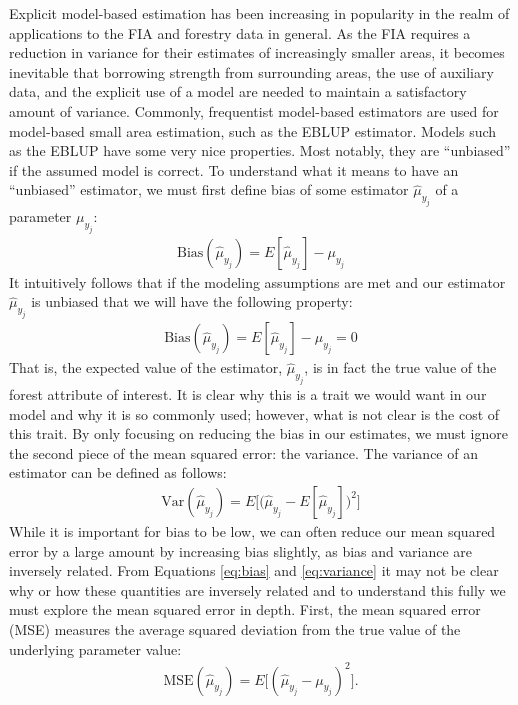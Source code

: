 \documentclass[12pt,twoside]{reedthesis}
\begin{document}
Explicit model-based estimation has been increasing in popularity in the realm of applications to the FIA and forestry data in general. As the FIA requires a reduction in variance for their estimates of increasingly smaller areas, it becomes inevitable that borrowing strength from surrounding areas, the use of auxiliary data, and the explicit use of a model are needed to maintain a satisfactory amount of variance. Commonly, frequentist model-based estimators are used for model-based small area estimation, such as the EBLUP estimator. Models such as the EBLUP have some very nice properties. Most notably, they are ``unbiased'' if the assumed model is correct. To understand what it means to have an ``unbiased'' estimator, we must first define bias of some estimator \(\hat\mu_{y_j}\) of a parameter \(\mu_{y_j}\):
\begin{align}
\text{Bias}(\hat\mu_{y_j}) = E[\hat\mu_{y_j}] - \mu_{y_j} \label{eq:bias}
\end{align}
It intuitively follows that if the modeling assumptions are met and our estimator \(\hat\mu_{y_j}\) is unbiased that we will have the following property:
\begin{align}
\text{Bias}(\hat\mu_{y_j}) = E[\hat\mu_{y_j}] - \mu_{y_j} = 0
\end{align}
That is, the expected value of the estimator, \(\hat\mu_{y_j}\), is in fact the true value of the forest attribute of interest. It is clear why this is a trait we would want in our model and why it is so commonly used; however, what is not clear is the cost of this trait. By only focusing on reducing the bias in our estimates, we must ignore the second piece of the mean squared error: the variance. The variance of an estimator can be defined as follows:
\begin{align}
\text{Var}(\hat\mu_{y_j}) = E\Big[\Big(\hat\mu_{y_j} - E[\hat\mu_{y_j}]\Big)^2 \Big] \label{eq:variance}
\end{align}
While it is important for bias to be low, we can often reduce our mean squared error by a large amount by increasing bias slightly, as bias and variance are inversely related. From Equations \eqref{eq:bias} and \eqref{eq:variance} it may not be clear why or how these quantities are inversely related and to understand this fully we must explore the mean squared error in depth. First, the mean squared error (MSE) measures the average squared deviation from the true value of the underlying parameter value:
\begin{align}
\text{MSE}(\hat\mu_{y_j}) = E\Big[(\hat\mu_{y_j} - \mu_{y_j})^2\Big].
\end{align}
\end{document}
